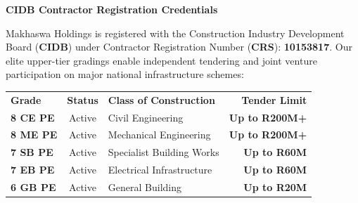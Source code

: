 \documentclass[a4paper,11pt]{article}
\begin{document}
\noindent
\begin{minipage}[t]{0.62\textwidth}
    {\large\bfseries\color{mhnavy} CIDB Contractor Registration Credentials}
    \vspace{0.10cm}

    {\fontsize{8.8pt}{12.4pt}\selectfont\color{mhtext}
    Makhaswa Holdings is registered with the Construction Industry Development Board (\textbf{CIDB}) under Contractor Registration Number (\textbf{CRS}): \textbf{10153817}. Our elite upper-tier gradings enable independent tendering and joint venture participation on major national infrastructure schemes:
    }

    \vspace{0.15cm}

    \renewcommand{\arraystretch}{1.25}
    \begin{tabularx}{\linewidth}{@{}l c p{3.6cm} r@{}}
    \rowcolor{mhnavy}
    {\color{white}\bfseries\fontsize{7.6pt}{9.2pt}\selectfont Grade} & {\color{white}\bfseries\fontsize{7.6pt}{9.2pt}\selectfont Status} & {\color{white}\bfseries\fontsize{7.6pt}{9.2pt}\selectfont Class of Construction} & {\color{white}\bfseries\fontsize{7.6pt}{9.2pt}\selectfont Tender Limit} \\
    \rowcolor{mhbluelight}
    \fontsize{7.5pt}{9.2pt}\selectfont\bfseries 8 CE PE & \fontsize{7.5pt}{9.2pt}\selectfont Active & \fontsize{7.5pt}{9.2pt}\selectfont Civil Engineering & \fontsize{7.5pt}{9.2pt}\selectfont\bfseries Up to R200M+ \\
    \fontsize{7.5pt}{9.2pt}\selectfont\bfseries 8 ME PE & \fontsize{7.5pt}{9.2pt}\selectfont Active & \fontsize{7.5pt}{9.2pt}\selectfont Mechanical Engineering & \fontsize{7.5pt}{9.2pt}\selectfont\bfseries Up to R200M+ \\
    \rowcolor{mhbluelight}
    \fontsize{7.5pt}{9.2pt}\selectfont\bfseries 7 SB PE & \fontsize{7.5pt}{9.2pt}\selectfont Active & \fontsize{7.5pt}{9.2pt}\selectfont Specialist Building Works & \fontsize{7.5pt}{9.2pt}\selectfont\bfseries Up to R60M \\
    \fontsize{7.5pt}{9.2pt}\selectfont\bfseries 7 EB PE & \fontsize{7.5pt}{9.2pt}\selectfont Active & \fontsize{7.5pt}{9.2pt}\selectfont Electrical Infrastructure & \fontsize{7.5pt}{9.2pt}\selectfont\bfseries Up to R60M \\
    \rowcolor{mhbluelight}
    \fontsize{7.5pt}{9.2pt}\selectfont\bfseries 6 GB PE & \fontsize{7.5pt}{9.2pt}\selectfont Active & \fontsize{7.5pt}{9.2pt}\selectfont General Building & \fontsize{7.5pt}{9.2pt}\selectfont\bfseries Up to R20M \\
    \end{tabularx}
    \renewcommand{\arraystretch}{1}
\end{minipage}
\end{document}
